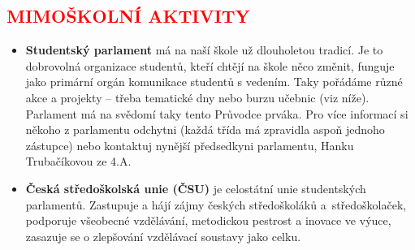 \documentclass[a5paper, twoside]{article}
\newcommand{\podnadpis}[2]{
  \subsection*{\textcolor{#2}{#1}}
}
\begin{document}
\podnadpis{MIMOŠKOLNÍ AKTIVITY}{red}
\begin{itemize}[leftmargin=10pt]
  \item \textbf{Studentský parlament} má na naší škole už dlouholetou tradicí. Je to dobrovolná organizace studentů, kteří chtějí na škole něco změnit, funguje jako primární orgán komunikace studentů s vedením. Taky pořádáme různé akce a projekty -- třeba tematické dny nebo burzu učebnic (viz níže). Parlament má na svědomí taky tento {\Kapitan Průvodce prváka}. Pro více informací si někoho z parlamentu odchytni (každá třída má zpravidla aspoň jednoho zástupce) nebo kontaktuj nynější předsedkyni parlamentu, Hanku Trubačíkovou ze 4.A.
	\item \textbf{Česká středoškolská unie (ČSU)} je celostátní unie studentských parlamentů. Zastupuje a hájí zájmy českých středoškoláků a~středoškolaček, podporuje všeobecné vzdělávání, metodickou pestrost a inovace ve výuce, zasazuje se o zlepšování vzdělávací soustavy jako celku.
\end{itemize}

\pagebreak
\end{document}
